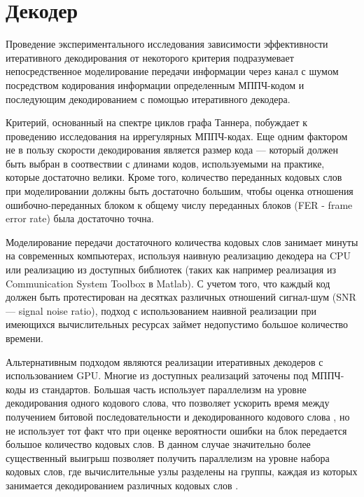 \chapter{Декодер}

Проведение экспериментального исследования зависимости эффективности итеративного декодирования от некоторого
критерия подразумевает непосредственное моделирование передачи информации через канал с шумом посредством 
кодирования информации определенным МППЧ-кодом и последующим декодированием с помощью итеративного декодера.

Критерий, основанный на спектре циклов графа Таннера, побуждает к проведению исследования на иррегулярных
МППЧ-кодах. Еще одним фактором не в пользу скорости декодирования является размер кода --- который
должен быть выбран в соотвествии с длинами кодов, используемыми на практике, которые достаточно велики.
Кроме того, количество переданных кодовых слов при моделировании должны быть достаточно большим, чтобы оценка
отношения ошибочно-переданных блоком к общему числу переданных блоков (FER - frame error rate) была достаточно точна.

Моделирование передачи достаточного количества кодовых слов занимает минуты на современных 
компьютерах, используя наивную реализацию декодера на CPU или реализацию из доступных библиотек 
(таких как например реализация из Communication System Toolbox в Matlab). 
С учетом того, что каждый код должен быть протестирован на десятках различных отношений сигнал-шум (SNR ---
signal noise ratio), подход с использованием наивной реализации при имеющихся вычислительных ресурсах займет
недопустимо большое количество времени. 

Альтернативным подходом являются реализации итеративных декодеров с использованием
GPU.
Многие из доступных реализаций заточены под МППЧ-коды из стандартов. Большая часть использует параллелизм
на уровне декодирования одного кодового слова, что позволяет ускорить время между получением 
битовой последовательности и декодированного кодового слова
\cite{stressing-the-ber-simulation-of-ldpc-codes-in-the-error-floor-region-using-gpu-clusters}, 
но не использует тот факт что при оценке вероятности ошибки на блок передается большое количество кодовых
слов. В данном случае значительно более существенный выигрыш позволяет получить параллелизм
на уровне набора кодовых слов, где вычислительные узлы разделены на группы, каждая из которых занимается
декодированием различных кодовых слов
\cite{opencl-cuda-algorithms-for-parallel-decoding-of-any-irregular-ldpc-code-using-gpu}.

